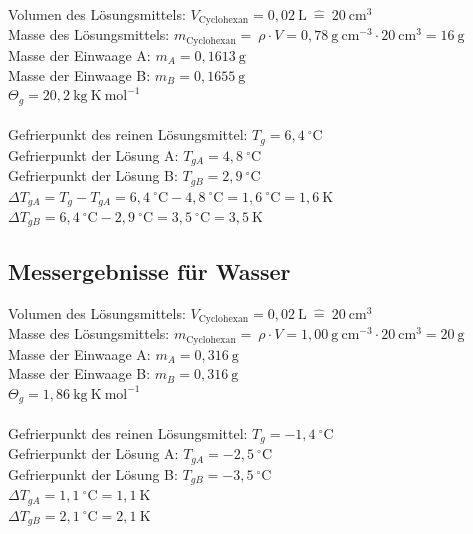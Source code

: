 \documentclass[12pt,a4paper,titlepage,headinclude,bibtotoc]{scrartcl}
\begin{document}
Volumen des Lösungsmittels: $V_{\mathrm{Cyclohexan}} = 0,02 {~} \mathrm{L}{~}\widehat{=}{~}20 {~}\mathrm{cm^3}$ \\
Masse des Lösungsmittels:  $m_{\mathrm{Cyclohexan}} = {~} \rho \cdot V = 0,78{~} \mathrm{g {~}cm^{-3}} \cdot 20{~} \mathrm{cm^{3}} = 16{~}\mathrm{g}$\\
Masse der Einwaage A: $m_A = 0,1613{~} \mathrm{g}$\\ 
Masse der Einwaage B: $m_B = 0,1655{~} \mathrm{g}$\\
$\Theta _g = 20,2 {~} \mathrm{kg{~}K {~} mol^{-1}}$\\\\
Gefrierpunkt des reinen Lösungsmittel: $ T_g = 6,4 {~}^{\circ}\text{C}$\\
Gefrierpunkt der Lösung A: $ T_{gA} = 4,8 {~}^{\circ}\text{C}$\\
Gefrierpunkt der Lösung B: $ T_{gB} = 2,9 {~}^{\circ}\text{C}$\\
$ \Delta T _{gA} = T_g - T _{gA} = 6,4 {~}^{\circ}\text{C} - 4,8 {~}^{\circ}\text{C} = 1,6 {~}^{\circ}\text{C} = 1,6{~}\mathrm{K} $\\
$ \Delta T _{gB} = 6,4 {~}^{\circ}\text{C} - 2,9 {~}^{\circ}\text{C} = 3,5 {~}^{\circ}\text{C} = 3,5 {~} \mathrm{K} $
\subsection{Messergebnisse für Wasser}

Volumen des Lösungsmittels: $V_{\mathrm{Cyclohexan}} = 0,02 {~} \mathrm{L}{~}\widehat{=}{~}20 {~}\mathrm{cm^3}$ \\
Masse des Lösungsmittels:  $m_{\mathrm{Cyclohexan}} = {~} \rho \cdot V = 1,00{~} \mathrm{g {~}cm^{-3}} \cdot 20{~} \mathrm{cm^{3}} = 20{~}\mathrm{g}$\\
Masse der Einwaage A: $m_A = 0,316{~} \mathrm{g}$\\ 
Masse der Einwaage B: $m_B = 0,316{~} \mathrm{g}$\\
$\Theta _g = 1,86 {~}\mathrm{kg{~}K {~} mol^{-1}}$\\\\
Gefrierpunkt des reinen Lösungsmittel: $ T_g = -1,4 {~}^{\circ}\text{C}$\\
Gefrierpunkt der Lösung A: $ T_{gA} = -2,5 {~}^{\circ}\text{C}$\\
Gefrierpunkt der Lösung B: $ T_{gB} = -3,5 {~}^{\circ}\text{C}$\\
$ \Delta T _{gA} =  1,1 {~}^{\circ}\text{C} = 1,1 {~}\mathrm{K} $\\
$ \Delta T _{gB} = 2,1 {~}^{\circ}\text{C} = 2,1{~} \mathrm{K} $
\end{document}
